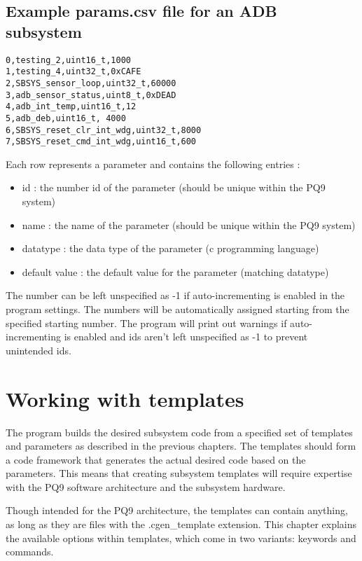 \documentclass{settings/TU_Delft_Report}
\begin{document}
\section{Example params.csv file for an ADB subsystem} \label{s:csvexample}
\begin{lstlisting}0,testing_2,uint16_t,1000
1,testing_4,uint32_t,0xCAFE
2,SBSYS_sensor_loop,uint32_t,60000
3,adb_sensor_status,uint8_t,0xDEAD
4,adb_int_temp,uint16_t,12
5,adb_deb,uint16_t, 4000
6,SBSYS_reset_clr_int_wdg,uint32_t,8000
7,SBSYS_reset_cmd_int_wdg,uint16_t,600
\end{lstlisting}

Each row represents a parameter and contains the following entries :
\begin{itemize}
    \item id : the number id of the parameter (should be unique within the PQ9 system)
    \item name : the name of the parameter (should be unique within the PQ9 system)
    \item datatype : the data type of the parameter (c programming language)
    \item default value : the default value for the parameter (matching datatype)
\end{itemize}

\vsp The number can be left unspecified as -1 if auto-incrementing is enabled in the program settings. The numbers will be automatically assigned starting from the specified starting number. The program will print out warnings if auto-incrementing is enabled and ids aren't left unspecified as -1 to prevent unintended ids.





\chapter{Working with templates}\label{wwtemp}
The program builds the desired subsystem code from a specified set of templates and parameters as described in the previous chapters. The templates should form a code framework that generates the actual desired code based on the parameters. This means that creating subsystem templates will require expertise with the PQ9 software architecture and the subsystem hardware.

Though intended for the PQ9 architecture, the templates can contain anything, as long as they are files with the .cgen\_template extension. This chapter explains the available options within templates, which come in two variants: keywords and commands.
\end{document}

